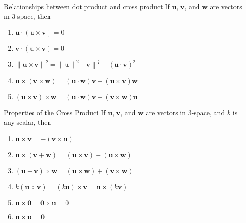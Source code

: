 \documentclass[\main/notes.tex]{subfiles}
\begin{document}
			\begin{sidenote}{Relationships between dot product and cross product}
				If $\mathbf{u}$, $\mathbf{v}$, and $\mathbf{w}$ are vectors in $3$-space, then
				\begin{enumerate}[label=(\alph*)]
					\item $\mathbf{u} \cdot (\mathbf{u} \times \mathbf{v}) = 0$
					\item $\mathbf{v} \cdot (\mathbf{u} \times \mathbf{v}) = 0$
					\item $\left\lVert \mathbf{u} \times \mathbf{v}\right\rVert^{2} = \left\lVert \mathbf{u}\right\rVert^{2}\left\lVert \mathbf{v}\right\rVert^{2} - (\mathbf{u} \cdot \mathbf{v})^{2}$
					\item $\mathbf{u} \times (\mathbf{v} \times \mathbf{w}) = (\mathbf{u} \cdot \mathbf{w})\mathbf{v} - (\mathbf{u} \times \mathbf{v})\mathbf{w}$
					\item $(\mathbf{u} \times \mathbf{v}) \times \mathbf{w} = (\mathbf{u} \cdot \mathbf{w})\mathbf{v} - (\mathbf{v} \times \mathbf{w})\mathbf{u}$
				\end{enumerate}
			\end{sidenote}
			\begin{sidenote}{Properties of the Cross Product}
				If $\mathbf{u}$, $\mathbf{v}$, and $\mathbf{w}$ are vectors in $3$-space, and $k$ is any scalar, then
				\begin{enumerate}[label=(\alph*)]
					\item $\mathbf{u} \times \mathbf{v} = -(\mathbf{v} \times \mathbf{u})$
					\item $\mathbf{u} \times (\mathbf{v} + \mathbf{w}) = (\mathbf{u} \times \mathbf{v}) + (\mathbf{u} \times \mathbf{w})$
					\item $(\mathbf{u} + \mathbf{v}) \times \mathbf{w} = (\mathbf{u} \times \mathbf{w}) + (\mathbf{v} \times \mathbf{w})$
					\item $k(\mathbf{u} \times \mathbf{v}) = (k \mathbf{u}) \times \mathbf{v} = \mathbf{u} \times (k \mathbf{v})$
					\item $\mathbf{u} \times \mathbf{0} = \mathbf{0} \times \mathbf{u} = \mathbf{0}$
					\item $\mathbf{u} \times \mathbf{u} = \mathbf{0}$
				\end{enumerate}
			\end{sidenote}
\end{document}
